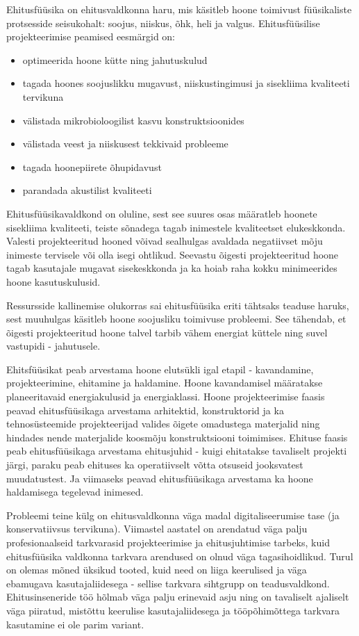 Ehitusfüüsika on ehitusvaldkonna haru, mis käsitleb hoone toimivust füüsikaliste protsesside seisukohalt: soojus, niiskus, õhk, heli ja valgus. Ehitusfüüsilise projekteerimise peamised eesmärgid on:
\begin{itemize}
    \item optimeerida hoone kütte ning jahutuskulud
    \item tagada hoones soojuslikku mugavust, niiskustingimusi ja sisekliima kvaliteeti tervikuna
    \item välistada mikrobioloogilist kasvu konstruktsioonides
    \item välistada veest ja niiskusest tekkivaid probleeme
    \item tagada hoonepiirete õhupidavust
    \item parandada akustilist kvaliteeti
\end{itemize}
Ehitusfüüsikavaldkond on oluline, sest see suures osas määratleb hoonete sisekliima kvaliteeti, teiste sõnadega tagab inimestele kvaliteetset elukeskkonda. Valesti projekteeritud hooned võivad
sealhulgas avaldada negatiivset mõju inimeste tervisele või olla isegi ohtlikud. Seevastu õigesti projekteeritud hoone tagab kasutajale mugavat sisekeskkonda ja ka hoiab raha kokku 
minimeerides hoone kasutuskulusid.

Ressursside kallinemise olukorras sai ehitusfüüsika eriti tähtsaks teaduse haruks, sest muuhulgas käsitleb hoone soojusliku toimivuse probleemi. See tähendab, et õigesti projekteeritud hoone
talvel tarbib vähem energiat küttele ning suvel vastupidi - jahutusele.

Ehitsfüüsikat peab arvestama hoone elutsükli igal etapil - kavandamine, projekteerimine, ehitamine ja haldamine. Hoone kavandamisel määratakse planeeritavaid energiakulusid ja energiaklassi.
Hoone projekteerimise faasis peavad ehitusfüüsikaga arvestama arhitektid, konstruktorid ja ka tehnosüsteemide projekteerijad valides õigete omadustega materjalid ning hindades nende
materjalide koosmõju konstruktsiooni toimimises. Ehituse faasis peab ehitusfüüsikaga arvestama ehitusjuhid - kuigi ehitatakse tavaliselt projekti järgi, paraku peab ehituses ka operatiivselt
võtta otsuseid jooksvatest muudatustest. Ja viimaseks peavad ehitusfüüsikaga arvestama ka hoone haldamisega tegelevad inimesed. 

Probleemi teine külg on ehitusvaldkonna väga madal digitaliseerumise tase (ja konservatiivsus tervikuna). Viimastel aastatel on arendatud väga palju profesionaalseid tarkvarasid
projekteerimise ja ehitusjuhtimise tarbeks, kuid ehitusfüüsika valdkonna tarkvara arendused on olnud väga tagasihoidlikud. Turul on olemas mõned üksikud tooted, kuid need on liiga 
keerulised ja väga ebamugava kasutajaliidesega - sellise tarkvara sihtgrupp on teadusvaldkond. Ehitusinseneride töö hõlmab väga palju erinevaid asju ning on tavaliselt ajaliselt väga
piiratud, mistõttu keerulise kasutajaliidesega ja tööpõhimõttega tarkvara kasutamine ei ole parim variant. 

